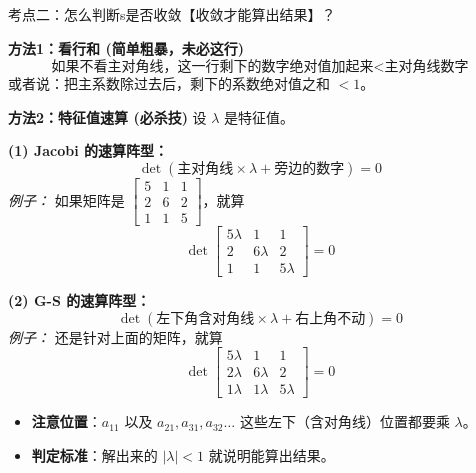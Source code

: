 \documentclass[12pt, a4paper]{article}
\begin{document}
\vspace{0.5em}
\begin{knowpoint}{考点二：怎么判断s是否收敛【收敛才能算出结果】？}
    
    \textbf{方法1：看行和 (简单粗暴，未必这行)}
    \[ \text{如果不看主对角线，这一行剩下的数字绝对值加起来} < \text{主对角线数字} \]
    或者说：把主系数除过去后，剩下的系数绝对值之和 $< 1$。
    
    \vspace{0.8em}
    \textbf{方法2：特征值速算 (必杀技)}
    设 $\lambda$ 是特征值。
    
    \textbf{(1) Jacobi 的速算阵型：}
    \[ \det( \text{主对角线} \times \lambda + \text{旁边的数字} ) = 0 \]
    \textit{例子：} 如果矩阵是 $\begin{bmatrix} 5 & 1 & 1 \\ 2 & 6 & 2 \\ 1 & 1 & 5 \end{bmatrix}$，就算
    \[ \det \begin{bmatrix} 5\lambda & 1 & 1 \\ 2 & 6\lambda & 2 \\ 1 & 1 & 5\lambda \end{bmatrix} = 0 \]
    
    \vspace{0.5em}
    \textbf{(2) G-S 的速算阵型：}
    \[ \det( \text{左下角含对角线} \times \lambda + \text{右上角不动} ) = 0 \]
    \textit{例子：} 还是针对上面的矩阵，就算
    \[ \det \begin{bmatrix} 5\lambda & 1 & 1 \\ 2\lambda & 6\lambda & 2 \\ 1\lambda & 1\lambda & 5\lambda \end{bmatrix} = 0 \]
    \begin{itemize}
        \item \textbf{注意位置}：$a_{11}$ 以及 $a_{21}, a_{31}, a_{32} \dots$ 这些左下（含对角线）位置都要乘 $\lambda$。
        \item \textbf{判定标准}：解出来的 $|\lambda| < 1$ 就说明能算出结果。
    \end{itemize}
\end{knowpoint}
\newpage
\end{document}
